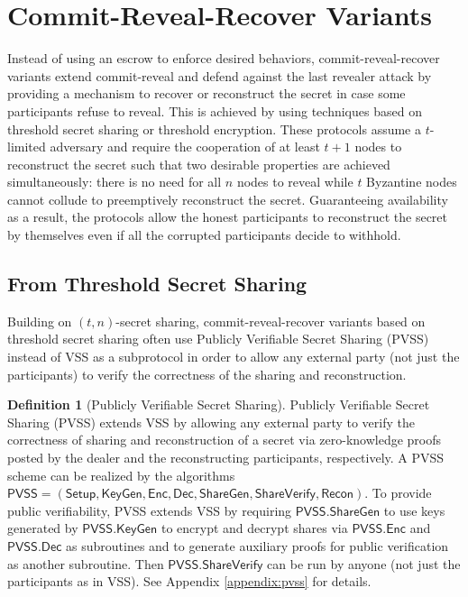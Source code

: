 \documentclass[letterpaper,twocolumn,10pt]{article}
\theoremstyle{definition}
\newtheorem{definition}[theorem]{Definition}
\theoremstyle{remark}
\begin{document}
\section{Commit-Reveal-Recover Variants}
\label{section:commit-reveal-recover}
Instead of using an escrow to enforce desired behaviors, commit-reveal-recover variants extend commit-reveal and defend against the last revealer attack by providing a mechanism to recover or reconstruct the secret in case some participants refuse to reveal. This is achieved by using techniques based on threshold secret sharing or threshold encryption. These protocols assume a $t$-limited adversary and require the cooperation of at least $t + 1$ nodes to reconstruct the secret such that two desirable properties are achieved simultaneously: there is no need for all $n$ nodes to reveal while $t$ Byzantine nodes cannot collude to preemptively reconstruct the secret. Guaranteeing availability as a result, the protocols allow the honest participants to reconstruct the secret by themselves even if all the corrupted participants decide to withhold.

\subsection{From Threshold Secret Sharing}
Building on $(t, n)$-secret sharing, commit-reveal-recover variants based on threshold secret sharing often use Publicly Verifiable Secret Sharing (PVSS) \cite{schoenmakers1999simple, cascudo2017scrape} instead of VSS as a subprotocol in order to allow any external party (not just the participants) to verify the correctness of the sharing and reconstruction.

\begin{definition}[Publicly Verifiable Secret Sharing]
Publicly Verifiable Secret Sharing (PVSS) extends VSS by allowing any external party to verify the correctness of sharing and reconstruction of a secret via zero-knowledge proofs posted by the dealer and the reconstructing participants, respectively. A PVSS scheme can be realized by the algorithms $\mathsf{PVSS} = (\mathsf{Setup}, \mathsf{KeyGen}, \mathsf{Enc}, \mathsf{Dec}, \mathsf{ShareGen}, \mathsf{ShareVerify}, \mathsf{Recon})$. To provide public verifiability, PVSS extends VSS by requiring $\mathsf{PVSS.ShareGen}$ to use keys generated by $\mathsf{PVSS.KeyGen}$ to encrypt and decrypt shares via $\mathsf{PVSS.Enc}$ and $\mathsf{PVSS.Dec}$ as subroutines and to generate auxiliary proofs for public verification as another subroutine. Then $\mathsf{PVSS.ShareVerify}$ can be run by anyone (not just the participants as in VSS). See Appendix \ref{appendix:pvss} for details.
\end{definition}
\end{document}
